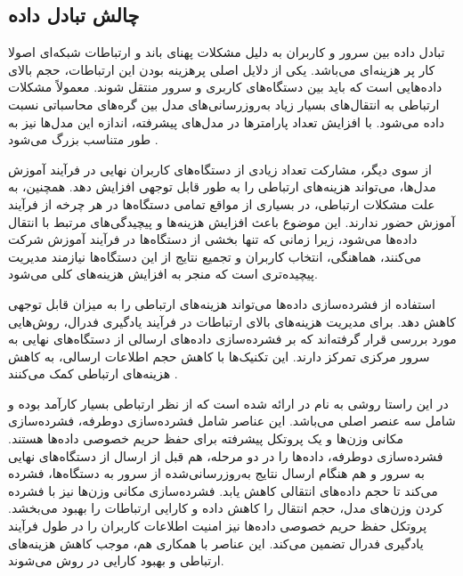 \subsection{چالش تبادل داده}
تبادل داده بین سرور و کاربران به دلیل مشکلات پهنای باند و ارتباطات شبکه‌ای اصولا کار پر هزینه‌ای می‌باشد. یکی از دلایل اصلی پرهزینه بودن این ارتباطات، حجم بالای داده‌هایی است که باید بین دستگاه‌های کاربری و سرور منتقل شوند.
معمولاً مشکلات ارتباطی به انتقال‌های بسیار زیاد به‌روزرسانی‌های مدل بین گره‌های محاسباتی نسبت داده می‌شود. با افزایش تعداد پارامترها در مدل‌های پیشرفته، اندازه این مدل‌ها نیز به طور متناسب بزرگ می‌شود
\cite{wang2018atomo}.

از سوی دیگر، مشارکت تعداد زیادی از دستگاه‌های کاربران نهایی در فرآیند آموزش مدل‌ها، می‌تواند هزینه‌های ارتباطی را به طور قابل توجهی افزایش دهد. همچنین، به علت مشکلات ارتباطی، در بسیاری از مواقع تمامی دستگاه‌ها در هر چرخه از فرآیند آموزش حضور ندارند. این موضوع باعث افزایش هزینه‌ها و پیچیدگی‌های مرتبط با انتقال داده‌ها می‌شود، زیرا زمانی که تنها بخشی از دستگاه‌ها در فرآیند آموزش شرکت می‌کنند، هماهنگی، انتخاب کاربران و تجمیع نتایج از این دستگاه‌ها نیازمند مدیریت پیچیده‌تری است که منجر به افزایش هزینه‌های کلی می‌شود.


استفاده از فشرده‌سازی داده‌ها می‌تواند هزینه‌های ارتباطی را به میزان قابل توجهی کاهش دهد. برای مدیریت هزینه‌های بالای ارتباطات در فرآیند یادگیری فدرال، روش‌هایی مورد بررسی قرار گرفته‌اند که بر فشرده‌سازی داده‌های ارسالی از دستگاه‌های نهایی به سرور مرکزی تمرکز دارند. این تکنیک‌ها با کاهش حجم اطلاعات ارسالی، به کاهش هزینه‌های ارتباطی کمک می‌کنند
\cite{konevcny2016federated}.

در این راستا روشی به نام
%
در
\cite{fang2021privacy}
ارائه شده است که از نظر ارتباطی بسیار کارآمد بوده و شامل سه عنصر اصلی می‌باشد. این عناصر شامل فشرده‌سازی دوطرفه، فشرده‌سازی مکانی وزن‌ها و یک پروتکل پیشرفته برای حفظ حریم خصوصی داده‌ها هستند. فشرده‌سازی دوطرفه، داده‌ها را در دو مرحله، هم قبل از ارسال از دستگاه‌های نهایی به سرور و هم هنگام ارسال نتایج به‌روزرسانی‌شده از سرور به دستگاه‌ها، فشرده می‌کند تا حجم داده‌های انتقالی کاهش یابد. فشرده‌سازی مکانی وزن‌ها نیز با فشرده کردن وزن‌های مدل، حجم انتقال را کاهش داده و کارایی ارتباطات را بهبود می‌بخشد. پروتکل حفظ حریم خصوصی داده‌ها نیز امنیت اطلاعات کاربران را در طول فرآیند یادگیری فدرال تضمین می‌کند. این عناصر با همکاری هم، موجب کاهش هزینه‌های ارتباطی و بهبود کارایی در روش
می‌شوند.



